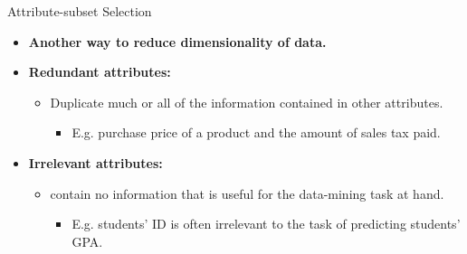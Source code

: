 \begin{frame}{Attribute-subset Selection}
	\begin{itemize}
		\item \textbf{Another way to reduce dimensionality of data.}
		      \item\textbf{\color{airforceblue}Redundant attributes:}
		      \begin{itemize}
			      \item Duplicate much or all of the information contained in other
			            attributes.
			            \begin{itemize}
				            \item E.g. purchase price of a product and the amount of sales
				                  tax paid.
			            \end{itemize}
		      \end{itemize}
		\item \textbf{\color{airforceblue}Irrelevant attributes:}
		      \begin{itemize}
			      \item contain no information that is useful for the data-mining
			            task at hand.
			            \begin{itemize}
				            \item E.g. students' ID is often irrelevant to the task of
				                  predicting students' GPA.
			            \end{itemize}
		      \end{itemize}
	\end{itemize}
\end{frame}

